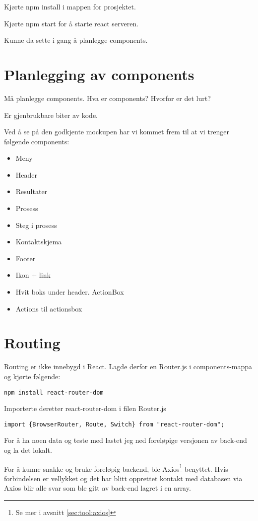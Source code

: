 Kjørte npm install i mappen for prosjektet.

Kjørte npm start for å starte react serveren.

Kunne da sette i gang  å planlegge components.

\section{Planlegging av components}
Må planlegge components. Hva er components? Hvorfor er det lurt?

Er gjenbrukbare biter av kode. 

Ved å se på den godkjente mockupen har vi kommet frem til at vi trenger følgende components: 
\begin{itemize}
\item Meny
\item Header
\item Resultater
\item Prosess
\item Steg i prosess
\item Kontaktskjema
\item Footer
\item Ikon + link
\item Hvit boks under header. ActionBox
\item Actions til actionsbox
\end{itemize}


\section{Routing}
Routing er ikke innebygd i React. Lagde derfor en Router.js i components-mappa og kjørte følgende:

\begin{lstlisting}
npm install react-router-dom
\end{lstlisting}

Importerte deretter react-router-dom i filen Router.js

\begin{lstlisting}
import {BrowserRouter, Route, Switch} from "react-router-dom";
\end{lstlisting}

For å ha noen data og teste med lastet jeg ned foreløpige versjonen av back-end og la det lokalt.

For å kunne snakke og bruke foreløpig backend, ble Axios\footnote{Se mer i avsnitt \ref{sec:tool:axios}} benyttet. Hvis forbindelsen er vellykket og det har blitt opprettet kontakt med databasen via Axios blir alle svar som ble gitt av back-end lagret i en array. 

